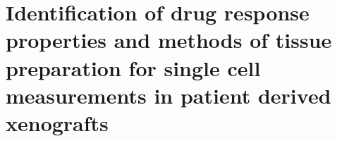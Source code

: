 \chapter{Identification of drug response properties and methods of tissue preparation for single cell measurements in patient derived xenografts %
}
\label{ch:Chapter 3}



